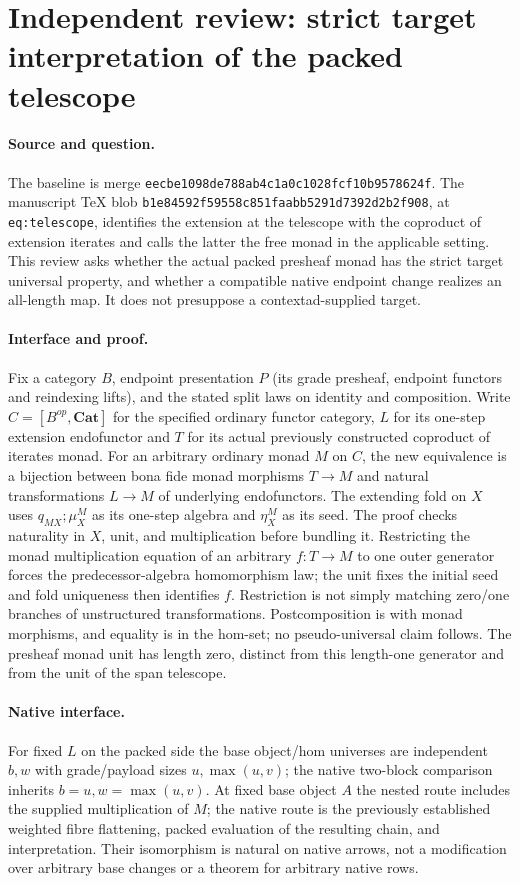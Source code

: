 \documentclass{article}
\begin{document}
\section*{Independent review: strict target interpretation of the packed telescope}
\paragraph{Source and question.} The baseline is merge
\texttt{eecbe1098de788ab4c1a0c1028fcf10b9578624f}. The manuscript TeX blob
\texttt{b1e84592f59558c851faabb5291d7392d2b2f908}, at \texttt{eq:telescope}, identifies the extension at the telescope with the coproduct of extension iterates and calls the latter the free monad in the applicable setting. This review asks whether the actual packed presheaf monad has the strict target universal property, and whether a compatible native endpoint change realizes an all-length map. It does not presuppose a contextad-supplied target.
\paragraph{Interface and proof.} Fix a category $B$, endpoint presentation $P$ (its grade presheaf, endpoint functors and reindexing lifts), and the stated split laws on identity and composition. Write $C=[B^{op},\mathbf{Cat}]$ for the specified ordinary functor category, $L$ for its one-step extension endofunctor and $T$ for its actual previously constructed coproduct of iterates monad. For an arbitrary ordinary monad $M$ on $C$, the new equivalence is a bijection between bona fide monad morphisms $T\to M$ and natural transformations $L\to M$ of underlying endofunctors. The extending fold on $X$ uses $q_{MX};\mu_X^M$ as its one-step algebra and $\eta_X^M$ as its seed. The proof checks naturality in $X$, unit, and multiplication before bundling it. Restricting the monad multiplication equation of an arbitrary $f:T\to M$ to one outer generator forces the predecessor-algebra homomorphism law; the unit fixes the initial seed and fold uniqueness then identifies $f$. Restriction is not simply matching zero/one branches of unstructured transformations. Postcomposition is with monad morphisms, and equality is in the hom-set; no pseudo-universal claim follows. The presheaf monad unit has length zero, distinct from this length-one generator and from the unit of the span telescope.
\paragraph{Native interface.} For fixed $L$ on the packed side the base object/hom universes are independent $b,w$ with grade/payload sizes $u,\max(u,v)$; the native two-block comparison inherits $b=u,w=\max(u,v)$. At fixed base object $A$ the nested route includes the supplied multiplication of $M$; the native route is the previously established weighted fibre flattening, packed evaluation of the resulting chain, and interpretation. Their isomorphism is natural on native arrows, not a modification over arbitrary base changes or a theorem for arbitrary native rows.
\end{document}
